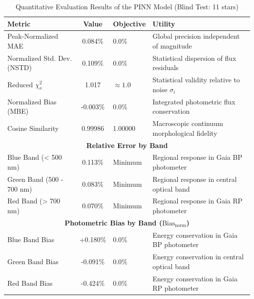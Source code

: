 
\begin{table}[htpb]
\centering
\caption{Quantitative Evaluation Results of the PINN Model (Blind Test: 11 stars)}
\label{tab:pinn_evaluation}
\begin{tabular}{lcll}
\hline
\textbf{Metric} & \textbf{Value} & \textbf{Objective} & \textbf{Utility} \\
\hline
Peak-Normalized MAE & 0.084\% & 0.0\% & Global precision independent of magnitude \\
Normalized Std. Dev. (NSTD) & 0.109\% & 0.0\% & Statistical dispersion of flux residuals \\
Reduced $\chi^2_\nu$ & 1.017 & $\approx 1.0$ & Statistical validity relative to noise $\sigma_i$ \\
Normalized Bias (MBE) & -0.003\% & 0.0\% & Integrated photometric flux conservation \\
Cosine Similarity & 0.99986 & 1.00000 & Macroscopic continuum morphological fidelity \\
\hline
\multicolumn{4}{c}{\textbf{Relative Error by Band}} \\
\hline
Blue Band (< 500 nm) & 0.113\% & Minimum & Regional response in Gaia BP photometer \\
Green Band (500 - 700 nm) & 0.083\% & Minimum & Regional response in central optical band \\
Red Band (> 700 nm) & 0.070\% & Minimum & Regional response in Gaia RP photometer \\
\hline
\multicolumn{4}{c}{\textbf{Photometric Bias by Band ($\text{Bias}_{\text{norm}}$)}} \\
\hline
Blue Band Bias & +0.180\% & 0.0\% & Energy conservation in Gaia BP photometer \\
Green Band Bias & -0.091\% & 0.0\% & Energy conservation in central optical band \\
Red Band Bias & -0.424\% & 0.0\% & Energy conservation in Gaia RP photometer \\
\hline
\end{tabular}
\end{table}
